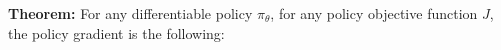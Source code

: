 \documentclass[preview]{standalone}
\begin{document}
\begin{center}
\textbf{Theorem:} For any differentiable policy $\pi_{\theta}$, for any policy objective function $J$, the policy gradient is the following:
\end{center}
\end{document}
